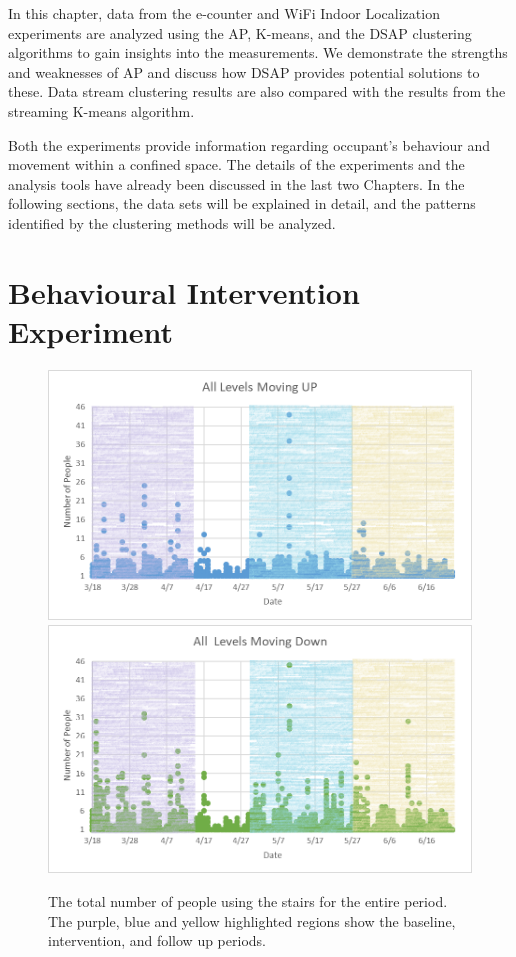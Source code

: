 In this chapter, data from the e-counter and WiFi Indoor Localization experiments are analyzed using the AP, K-means, and the DSAP clustering algorithms to gain insights into the measurements. We demonstrate the strengths and weaknesses of AP and discuss how DSAP provides potential solutions to these. Data stream clustering results are also compared with the results from the streaming K-means algorithm. 

Both the experiments provide information regarding occupant's behaviour and movement within a confined space. The details of the experiments and the analysis tools have already been discussed in the last two Chapters. In the following sections, the data sets will be explained in detail, and the patterns identified by the clustering methods will be analyzed.

 
\section{Behavioural Intervention Experiment} 


\begin{figure}[!h]
    \includegraphics[width=\textwidth]{image/up.png}\hfill
    \includegraphics[width=\textwidth]{image/down.png}
    \caption{The total number of people using the stairs for the entire period. The purple, blue and yellow highlighted regions show the baseline, intervention, and follow up periods.}
    \label{updown}
\end{figure}

